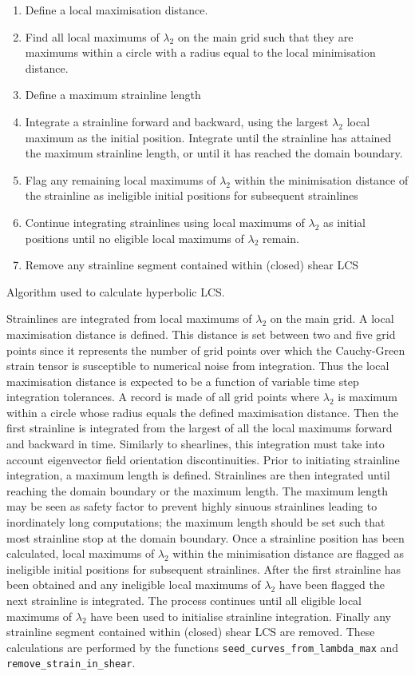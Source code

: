 \documentclass{article}
\begin{document}
\begin{table}
\begin{enumerate}
\item Define a local maximisation distance.
\item Find all local maximums of $\lambda_2$ on the main grid such that they are maximums within a circle with a radius equal to the local minimisation distance.
\item Define a maximum strainline length
\item Integrate a strainline forward and backward, using the largest $\lambda_2$ local maximum as the initial position. Integrate until the strainline has attained the maximum strainline length, or until it has reached the domain boundary.
\item Flag any remaining local maximums of $\lambda_2$ within the minimisation distance of the strainline as ineligible initial positions for subsequent strainlines
\item Continue integrating strainlines using local maximums of $\lambda_2$ as initial positions until no eligible local maximums of $\lambda_2$ remain.
\item Remove any strainline segment contained within (closed) shear LCS
\end{enumerate}
\caption{Algorithm used to calculate hyperbolic LCS.}
\label{t:Hyperbolic LCS algorithm}
\end{table}

Strainlines are integrated from local maximums of $\lambda_2$ on the main grid. A local maximisation distance is defined. This distance is set between two and five grid points since it represents the number of grid points over which the Cauchy-Green strain tensor is susceptible to numerical noise from integration. Thus the local maximisation distance is expected to be a function of variable time step integration tolerances. A record is made of all grid points where $\lambda_2$ is maximum within a circle whose radius equals the defined maximisation distance. Then the first strainline is integrated from the largest of all the local maximums forward and backward in time. Similarly to shearlines, this integration must take into account eigenvector field orientation discontinuities. Prior to initiating strainline integration, a maximum length is defined. Strainlines are then integrated until reaching the domain boundary or the maximum length. The maximum length may be seen as safety factor to prevent highly sinuous strainlines leading to inordinately long computations; the maximum length should be set such that most strainline stop at the domain boundary. Once a strainline position has been calculated, local maximums of $\lambda_2$ within the minimisation distance are flagged as ineligible initial positions for subsequent strainlines. After the first strainline has been obtained and any ineligible local maximums of $\lambda_2$ have been flagged the next strainline is integrated. The process continues until all eligible local maximums of $\lambda_2$ have been used to initialise strainline integration. Finally any strainline segment contained within (closed) shear LCS are removed. These calculations are performed by the functions \texttt{seed\_curves\_from\_lambda\_max} and \texttt{remove\_strain\_in\_shear}.
\end{document}

